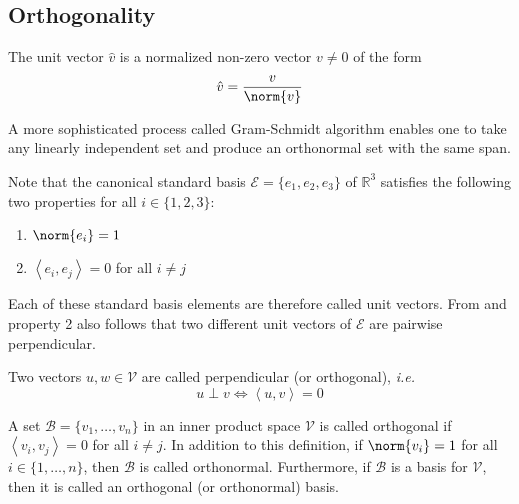 \subsection{Orthogonality}\label{subsec-orthogonality}

\begin{definition}\label{def-unit-vector}
	The unit vector $\hat{v}$ is a normalized non-zero vector $v\neq0$ of the form
	\begin{equation}\label{eq-unit-vector}
		\hat{v}=\frac{v}{\norm{v}}
	\end{equation}
\end{definition}

\begin{rem}\label{rem-gram-schmidt-algorithm}
	A more sophisticated process called Gram-Schmidt algorithm enables one to take
	any linearly independent set and produce an orthonormal set with the same span.
\end{rem}

\begin{rem}
	Note that the canonical standard basis $\mathcal{E}=\{e_1,e_2,e_3\}$ of
	$\mathbb{R}^3$ satisfies the following two properties for all $i\in\{1,2,3\}$:
	\begin{enumerate}
		\item $\norm{e_i}=1$
		\item $\left<e_i,e_j\right>=0$ for all $i \neq j$
	\end{enumerate}
	Each of these standard basis elements are therefore called unit vectors.
	From  and property 2 also follows that two
	different unit vectors of $\mathcal{E}$ are pairwise perpendicular.
\end{rem}

\begin{definition}\label{def-orthogonal-vectors}
	Two vectors $u,w\in\mathcal{V}$ are called perpendicular (or orthogonal),
	\textit{i.e.}
	\begin{equation}\label{eq-orthogonal-vectors}
		u \perp v \Leftrightarrow \left<u,v\right>=0
	\end{equation}
\end{definition}

\begin{definition}\label{def-orthonormal-basis}
	A set $\mathcal{B}=\{v_1,\dots,v_n\}$ in an inner product space $\mathcal{V}$
	is called orthogonal if $\left<v_i,v_j\right>=0$ for all $i\neq j$. In addition
	to this definition, if $\norm{v_i}=1$ for all $i\in\{1,\dots,n\}$, then
	$\mathcal{B}$ is called orthonormal. Furthermore, if $\mathcal{B}$ is a basis
	for $\mathcal{V}$, then it is called an orthogonal (or orthonormal) basis.
\end{definition}

